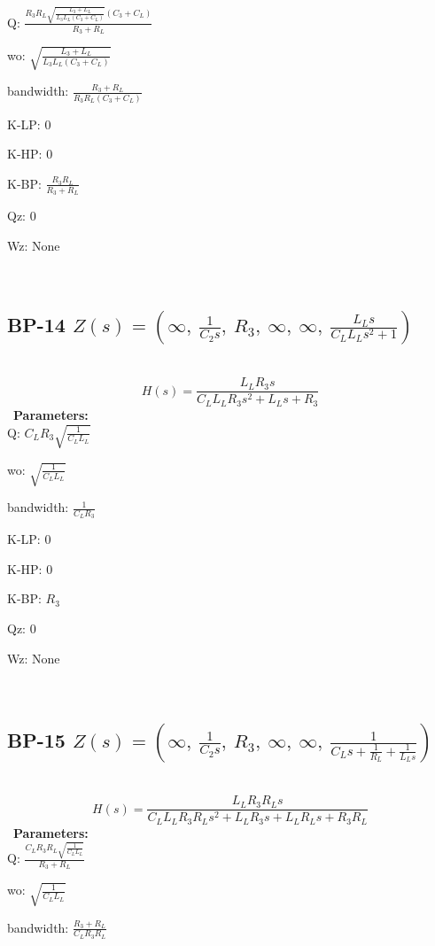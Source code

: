 \documentclass{article}
\begin{document}
Q: $\frac{R_{3} R_{L} \sqrt{\frac{L_{3} + L_{L}}{L_{3} L_{L} \left(C_{3} + C_{L}\right)}} \left(C_{3} + C_{L}\right)}{R_{3} + R_{L}}$\ 

wo: $\sqrt{\frac{L_{3} + L_{L}}{L_{3} L_{L} \left(C_{3} + C_{L}\right)}}$\ 

bandwidth: $\frac{R_{3} + R_{L}}{R_{3} R_{L} \left(C_{3} + C_{L}\right)}$\ 

K-LP: $0$\ 

K-HP: $0$\ 

K-BP: $\frac{R_{3} R_{L}}{R_{3} + R_{L}}$\ 

Qz: $0$\ 

Wz: $\text{None}$\ 

\ 

\subsection{BP-14 $Z(s) = \left( \infty, \  \frac{1}{C_{2} s}, \  R_{3}, \  \infty, \  \infty, \  \frac{L_{L} s}{C_{L} L_{L} s^{2} + 1}\right)$ } \ 
\textbf{\[H(s) = \frac{L_{L} R_{3} s}{C_{L} L_{L} R_{3} s^{2} + L_{L} s + R_{3}}\] } \ 
\textbf{Parameters:}\\ 

Q: $C_{L} R_{3} \sqrt{\frac{1}{C_{L} L_{L}}}$\ 

wo: $\sqrt{\frac{1}{C_{L} L_{L}}}$\ 

bandwidth: $\frac{1}{C_{L} R_{3}}$\ 

K-LP: $0$\ 

K-HP: $0$\ 

K-BP: $R_{3}$\ 

Qz: $0$\ 

Wz: $\text{None}$\ 

\ 

\subsection{BP-15 $Z(s) = \left( \infty, \  \frac{1}{C_{2} s}, \  R_{3}, \  \infty, \  \infty, \  \frac{1}{C_{L} s + \frac{1}{R_{L}} + \frac{1}{L_{L} s}}\right)$ } \ 
\textbf{\[H(s) = \frac{L_{L} R_{3} R_{L} s}{C_{L} L_{L} R_{3} R_{L} s^{2} + L_{L} R_{3} s + L_{L} R_{L} s + R_{3} R_{L}}\] } \ 
\textbf{Parameters:}\\ 

Q: $\frac{C_{L} R_{3} R_{L} \sqrt{\frac{1}{C_{L} L_{L}}}}{R_{3} + R_{L}}$\ 

wo: $\sqrt{\frac{1}{C_{L} L_{L}}}$\ 

bandwidth: $\frac{R_{3} + R_{L}}{C_{L} R_{3} R_{L}}$\ 
\end{document}
